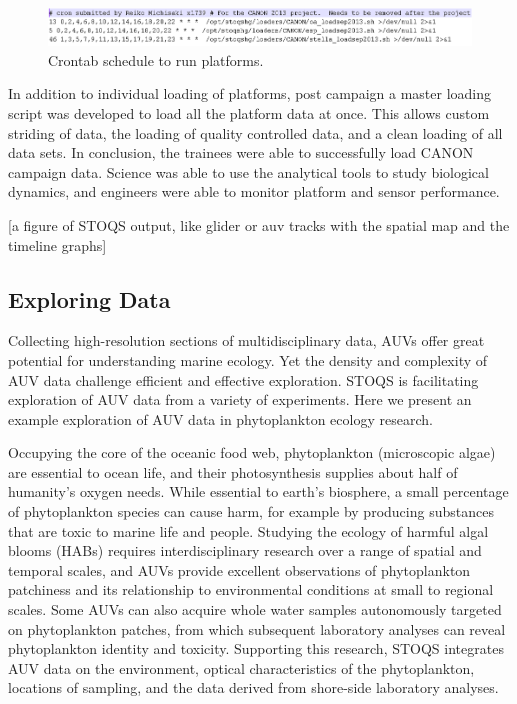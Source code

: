 \begin{figure}[htbp]
\centering
\includegraphics[width=6.6in]{ReikoFigure9.png}
\caption{Crontab schedule to run platforms.}
\label{fig:ReikoFigure9}
\end{figure}

In addition to individual loading of platforms, post campaign a master loading script was developed to load all the platform data at once.  This allows custom striding of data, the loading of quality controlled data, and a clean loading of all data sets.  In conclusion, the trainees were able to successfully load CANON campaign data.  Science was able to use the analytical tools to study biological dynamics, and engineers were able to monitor platform and sensor performance.  

[a figure of STOQS output, like glider or auv tracks with the spatial map and the timeline graphs]



\subsection{Exploring Data}
Collecting high-resolution sections of multidisciplinary data, AUVs offer great potential for understanding marine ecology.  Yet the density and complexity of AUV data challenge efficient and effective exploration.  STOQS is facilitating exploration of AUV data from a variety of experiments.  Here we present an example exploration of AUV data in phytoplankton ecology research.

Occupying the core of the oceanic food web, phytoplankton (microscopic algae) are essential to ocean life, and their photosynthesis supplies about half of humanity’s oxygen needs.  While essential to earth’s biosphere, a small percentage of phytoplankton species can cause harm, for example by producing substances that are toxic to marine life and people.  Studying the ecology of harmful algal blooms (HABs) requires interdisciplinary research over a range of spatial and temporal scales, and AUVs provide excellent observations of phytoplankton patchiness and its relationship to environmental conditions at small to regional scales.  Some AUVs can also acquire whole water samples autonomously targeted on phytoplankton patches, from which subsequent laboratory analyses can reveal phytoplankton identity and toxicity.  Supporting this research, STOQS integrates AUV data on the environment, optical characteristics of the phytoplankton, locations of sampling, and the data derived from shore-side laboratory analyses.

